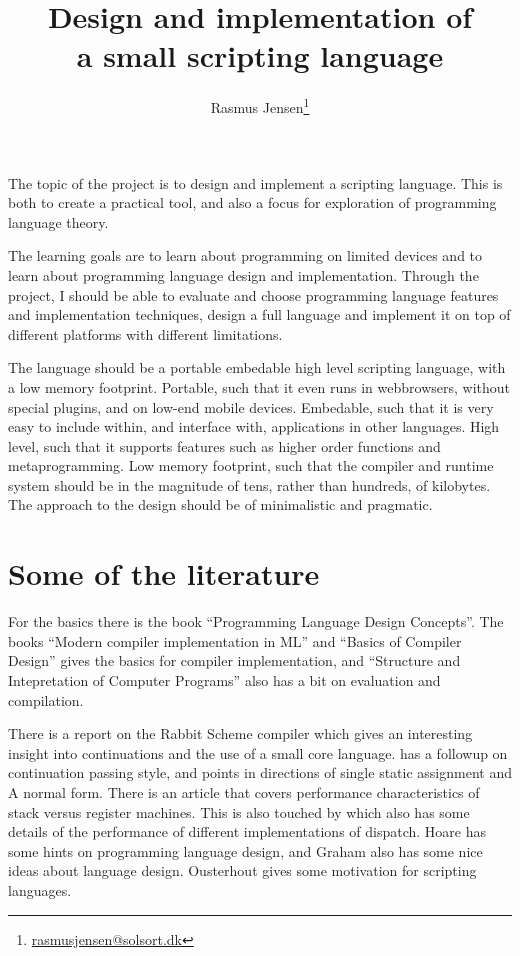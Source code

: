 \documentclass[12pt]{article}
\title{Design and implementation of \\ a small scripting language}
\author{Rasmus Jensen\footnote{\url{rasmusjensen@solsort.dk}}
}
\begin{document}
\maketitle



The topic of the project is to design and implement a scripting language.
This is both to create a practical tool, 
and also a focus for exploration of programming language theory.

The learning goals are to learn about programming on limited devices and to learn about programming language design and implementation. 
Through the project, I should be able to evaluate and choose programming language features and implementation techniques, design a full language and implement it on top of different platforms with different limitations.

The language should be a portable embedable high level scripting language, with a low memory footprint. 
Portable, such that it even runs in webbrowsers, without special plugins, and on low-end mobile devices. 
Embedable, such that it is very easy to include within, and interface with, applications in other languages.
High level, such that it supports features such as higher order functions and metaprogramming.
Low memory footprint, such that the compiler and runtime system should be in the magnitude of tens, rather than hundreds, of kilobytes.
The approach to the design should be of minimalistic and pragmatic.

\section{Some of the literature}

For the basics there is the book ``Programming Language Design Concepts''\cite{programming-language-design-concepts}. 
The books ``Modern compiler implementation in ML''\cite{tigerbook} 
and ``Basics of Compiler Design''\cite{basics-of-compiler-design} gives the basics for compiler implementation, and 
``Structure and Intepretation of Computer Programs''\cite{sicp} also has a bit on evaluation and compilation.

There is a report on the Rabbit\cite{rabbit} Scheme compiler which gives an interesting insight into continuations and the use of a small core language.
  \cite{essence-cps} has a followup on continuation passing style, and points in directions of single static assignment and A normal form.
There is an article\cite{stack-vs-register} that covers performance characteristics of stack versus register machines. 
This is also touched by \cite{case-for-vm} which also has some details of the performance of different implementations of dispatch.
Hoare\cite{hoare-hints} has some hints on programming language design, 
and Graham\cite{graham-five-questions} also has some nice ideas about language design. 
Ousterhout\cite{ousterhout-scripting} gives some motivation for scripting languages.
\end{document}

